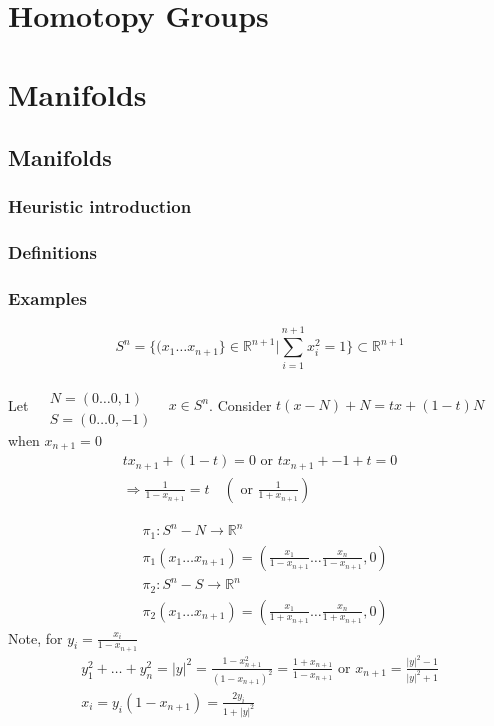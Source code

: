 \documentclass{book}
\newcommand{\exercisehead}[1]
  {\smallskip
   \noindent{\large\bf Exercise #1.}
   }
\begin{document}
\chapter{Homotopy Groups}





\chapter{Manifolds}

\section{Manifolds}

\subsection{Heuristic introduction}

\subsection{Definitions}

\subsection{Examples}

\exercisehead{5.1} 

\[
S^n = \lbrace ( x_1 \dots x_{n+1} \rbrace \in \mathbb{R}^{n+1} | \sum_{i=1}^{n+1} x_i^2 = 1 \rbrace \subset \mathbb{R}^{n+1}
\]

Let $\begin{aligned} & \quad \\
  & N = (0 \dots 0, 1) \\ 
  & S = (0 \dots 0, -1) \end{aligned}$ \quad \, $x\in S^n$.  Consider $t(x-N) + N = tx + (1-t)N$ when $x_{n+1} =0$ 
\[
\begin{gathered}
  tx_{n+1} + (1-t) = 0 \text{ or } tx_{n+1} + -1 + t = 0 \\ 
  \Longrightarrow \frac{ 1}{ 1- x_{n+1} } = t \quad \left( \text{ or } \frac{1}{ 1 + x_{n+1} } \right)
\end{gathered}
\]

\[
\begin{aligned}
  & \pi_1: S^n - N \to \mathbb{R}^n \\ 
  & \pi_1(x_1 \dots x_{n+1}) = \left( \frac{x_1}{ 1 - x_{n+1} } \dots \frac{x_n}{ 1 - x_{n+1} } , 0 \right) \\ 
  & \pi_2 : S^n -S \to \mathbb{R}^n \\ 
  & \pi_2(x_1 \dots x_{n+1}) = \left( \frac{x_1}{ 1 + x_{n+1}} \dots \frac{x_n}{ 1 + x_{n+1} }, 0 \right)
\end{aligned}
\]
Note, for $y_i = \frac{x_i}{ 1 - x_{n+1}}$
\[
\begin{gathered}
  y_1^2 + \dots +y_n^2 = |y|^2 = \frac{1-  x_{n+1}^2}{ (1-x_{n+1})^2 } = \frac{1+ x_{n+1}}{ 1- x_{n+1}} \text{ or } x_{n+1}  = \frac{ |y|^2 - 1 }{ |y|^2 + 1 }  \\
  x_i = y _i (1- x_{n+1}) = \frac{2y_i}{ 1 + |y|^2 }
\end{gathered}
\]
\end{document}
